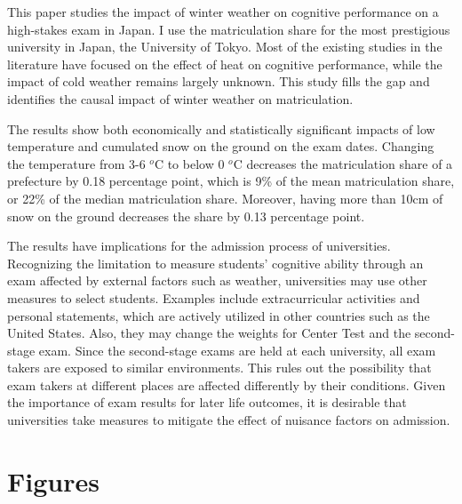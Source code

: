 \documentclass[12pt,letterpaper]{article}
\begin{document}
This paper studies the impact of winter weather on cognitive performance on a high-stakes exam in Japan.
I use the matriculation share for the most prestigious university in Japan, the University of Tokyo.
Most of the existing studies in the literature have focused on the effect of heat on cognitive performance, while the impact of cold weather remains largely unknown.
This study fills the gap and identifies the causal impact of winter weather on matriculation.

The results show both economically and statistically significant impacts of low temperature and cumulated snow on the ground on the exam dates.
Changing the temperature from 3-6 $^o$C to below 0 $^o$C decreases the matriculation share of a prefecture by 0.18 percentage point, which is 9\% of the mean matriculation share, or 22\% of the median matriculation share.
Moreover, having more than 10cm of snow on the ground decreases the share by 0.13 percentage point.

The results have implications for the admission process of universities.
Recognizing the limitation to measure students' cognitive ability through an exam affected by external factors such as weather, universities may use other measures to select students.
Examples include extracurricular activities and personal statements, which are actively utilized in other countries such as the United States.
Also, they may change the weights for Center Test and the second-stage exam.
Since the second-stage exams are held at each university, all exam takers are exposed to similar environments.
This rules out the possibility that exam takers at different places are affected differently by their conditions.
Given the importance of exam results for later life outcomes, it is desirable that universities take measures to mitigate the effect of nuisance factors on admission.

\clearpage



\section{Figures}
\end{document}
